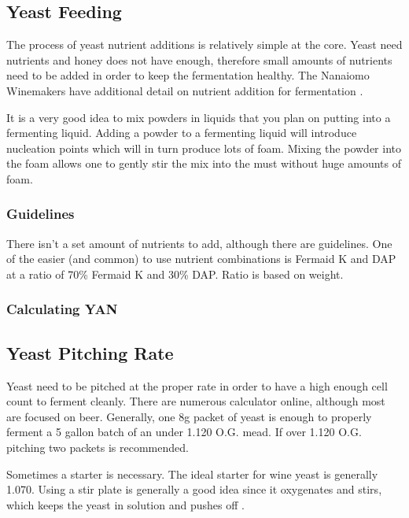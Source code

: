 \documentclass{article}
\begin{document}
 \subsection{Yeast Feeding}
  The process of yeast nutrient additions is relatively simple at the core. Yeast need nutrients and honey does not have enough, therefore small amounts
  of nutrients need to be added in order to keep the fermentation healthy. The Nanaiomo Winemakers have additional detail on nutrient addition for fermentation
  \cite{nanaiomo-fermentation}. 

  It is a very good idea to mix powders in liquids that you plan on putting into a fermenting liquid. Adding a powder to a fermenting liquid will introduce nucleation
  points which will in turn produce lots of foam. Mixing the powder into the foam allows one to gently stir the mix into the must without huge amounts of foam.
  \subsubsection{Guidelines}
   There isn't a set amount of nutrients to add, although there are guidelines. One of the easier (and common) to use nutrient 
   combinations is Fermaid K and DAP at a ratio of 70\% Fermaid K and 30\% DAP. Ratio is based on weight. 

  \subsubsection{Calculating YAN}

 \subsection{Yeast Pitching Rate}
  Yeast need to be pitched at the proper rate in order to have a high enough cell count to ferment cleanly. There are numerous calculator online, although most
  are focused on beer. Generally, one 8g packet of yeast is enough to properly ferment a 5 gallon batch of an under 1.120 O.G. mead. If over 1.120 O.G. pitching
  two packets is recommended. 

  Sometimes a starter is necessary. The ideal starter for wine yeast is generally 1.070. Using a stir plate is generally a good idea since it oxygenates and stirs,
  which keeps the yeast in solution and pushes off .
\end{document}
